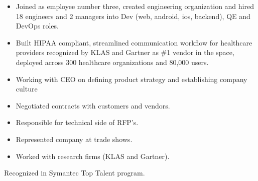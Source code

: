 \documentclass[11pt,a4paper,roman]{moderncv}       %
\begin{document}

\begin{itemize}
    \item Joined as employee number three, created engineering organization and hired 18 engineers and 2 managers into Dev (web, android, ios, backend), QE and DevOps roles. 
    \item Built HIPAA compliant, streamlined communication workflow for healthcare providers recognized by KLAS and Gartner as \#1 vendor in the space, deployed across 300 healthcare organizations and 80,000 users.
    \item Working with CEO on defining product strategy and establishing company culture 
    \item Negotiated contracts with customers and vendors.
    \item Responsible for technical side of RFP's.
    \item Represented company at trade shows.
    \item Worked with research firms (KLAS and Gartner).
\end{itemize}

\vspace{16pt}
\pagebreak


Recognized in Symantec Top Talent program.

\vspace{6pt}
\end{document}
